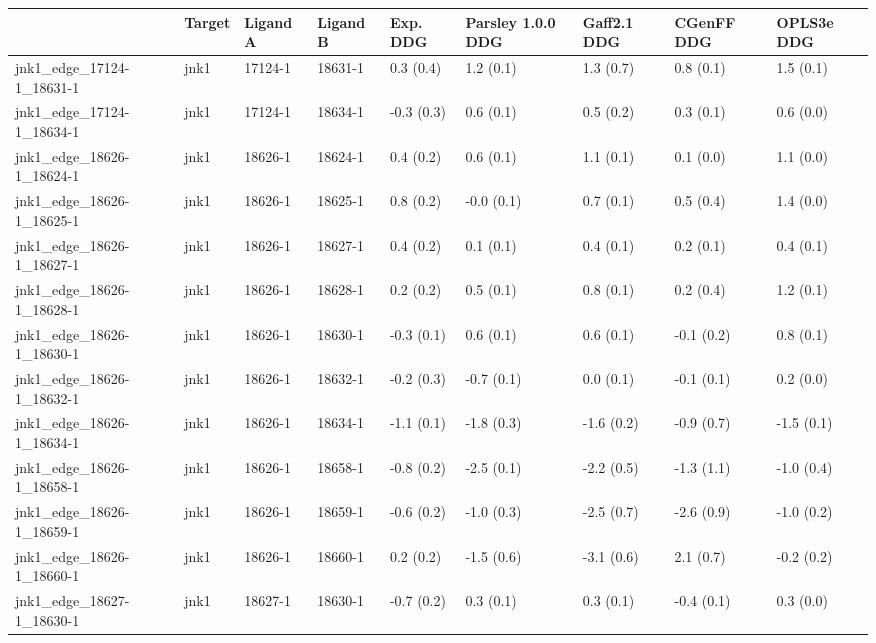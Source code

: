 \begin{tabular}{lllllllll}
\toprule
{} &    Target &    Ligand A &    Ligand B &    Exp. DDG & Parsley 1.0.0 DDG & Gaff2.1 DDG &  CGenFF DDG &  OPLS3e DDG \\
\midrule
jnk1\_edge\_17124-1\_18631-1        &      jnk1 &     17124-1 &     18631-1 &   0.3 (0.4) &         1.2 (0.1) &   1.3 (0.7) &   0.8 (0.1) &   1.5 (0.1) \\
jnk1\_edge\_17124-1\_18634-1        &      jnk1 &     17124-1 &     18634-1 &  -0.3 (0.3) &         0.6 (0.1) &   0.5 (0.2) &   0.3 (0.1) &   0.6 (0.0) \\
jnk1\_edge\_18626-1\_18624-1        &      jnk1 &     18626-1 &     18624-1 &   0.4 (0.2) &         0.6 (0.1) &   1.1 (0.1) &   0.1 (0.0) &   1.1 (0.0) \\
jnk1\_edge\_18626-1\_18625-1        &      jnk1 &     18626-1 &     18625-1 &   0.8 (0.2) &        -0.0 (0.1) &   0.7 (0.1) &   0.5 (0.4) &   1.4 (0.0) \\
jnk1\_edge\_18626-1\_18627-1        &      jnk1 &     18626-1 &     18627-1 &   0.4 (0.2) &         0.1 (0.1) &   0.4 (0.1) &   0.2 (0.1) &   0.4 (0.1) \\
jnk1\_edge\_18626-1\_18628-1        &      jnk1 &     18626-1 &     18628-1 &   0.2 (0.2) &         0.5 (0.1) &   0.8 (0.1) &   0.2 (0.4) &   1.2 (0.1) \\
jnk1\_edge\_18626-1\_18630-1        &      jnk1 &     18626-1 &     18630-1 &  -0.3 (0.1) &         0.6 (0.1) &   0.6 (0.1) &  -0.1 (0.2) &   0.8 (0.1) \\
jnk1\_edge\_18626-1\_18632-1        &      jnk1 &     18626-1 &     18632-1 &  -0.2 (0.3) &        -0.7 (0.1) &   0.0 (0.1) &  -0.1 (0.1) &   0.2 (0.0) \\
jnk1\_edge\_18626-1\_18634-1        &      jnk1 &     18626-1 &     18634-1 &  -1.1 (0.1) &        -1.8 (0.3) &  -1.6 (0.2) &  -0.9 (0.7) &  -1.5 (0.1) \\
jnk1\_edge\_18626-1\_18658-1        &      jnk1 &     18626-1 &     18658-1 &  -0.8 (0.2) &        -2.5 (0.1) &  -2.2 (0.5) &  -1.3 (1.1) &  -1.0 (0.4) \\
jnk1\_edge\_18626-1\_18659-1        &      jnk1 &     18626-1 &     18659-1 &  -0.6 (0.2) &        -1.0 (0.3) &  -2.5 (0.7) &  -2.6 (0.9) &  -1.0 (0.2) \\
jnk1\_edge\_18626-1\_18660-1        &      jnk1 &     18626-1 &     18660-1 &   0.2 (0.2) &        -1.5 (0.6) &  -3.1 (0.6) &   2.1 (0.7) &  -0.2 (0.2) \\
jnk1\_edge\_18627-1\_18630-1        &      jnk1 &     18627-1 &     18630-1 &  -0.7 (0.2) &         0.3 (0.1) &   0.3 (0.1) &  -0.4 (0.1) &   0.3 (0.0) \\

\end{tabular}
